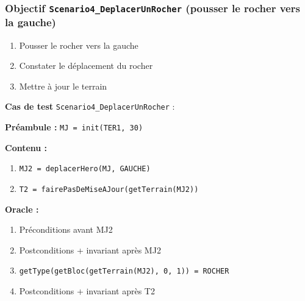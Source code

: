 \documentclass{article}
\newcommand{\cmd}[1]{\texttt{#1}}
\newcommand{\obj}[2]{\subsubsection*{\large{\textbf{Objectif {\cmd{#1} (#2)}}}}}
\newenvironment{cas}[1]
{
	\hspace{1em}\textbf{Cas de test} \cmd{#1} :
	\begin{list}{}{}
}{
	\end{list}\vspace{1em}
}
\newcommand{\pre}[1]{\item \textbf{Préambule :} \cmd{#1}}
\newcommand{\oram}{\item \textbf{Oracle :}}
\newcommand{\opem}{\item \textbf{Contenu :}}
\begin{document}
\obj{Scenario4\_DeplacerUnRocher} {pousser le rocher vers la gauche}

	\begin{enumerate}
		\item Pousser le rocher vers la gauche
		\item Constater le déplacement du rocher
		\item Mettre à jour le terrain
	\end{enumerate}

	\begin{cas} {Scenario4\_DeplacerUnRocher}
		\pre{MJ = init(TER1, 30)}
		\opem{}
		\begin{enumerate}
			\item \cmd{MJ2 = deplacerHero(MJ, GAUCHE)}
			\item \cmd{T2 = fairePasDeMiseAJour(getTerrain(MJ2))}
		\end{enumerate}
		\oram{}
		\begin{enumerate}
			\item Préconditions avant MJ2
			\item Postconditions + invariant après MJ2
			\item \cmd{getType(getBloc(getTerrain(MJ2), 0, 1)) = ROCHER}
			\item Postconditions + invariant après T2
		\end{enumerate}
	\end{cas}
\end{document}
